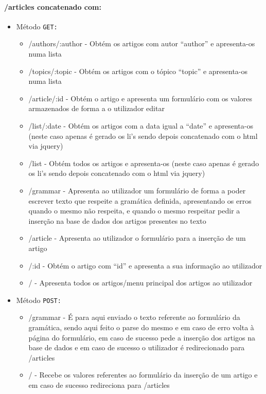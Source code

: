 \paragraph{/articles concatenado com:} 
\begin{itemize}
    \item Método \texttt{GET:}
        \begin{itemize}
            \item /authors/:author - Obtém os artigos com autor ``author'' e apresenta-os numa lista
            \item /topics/:topic - Obtém os artigos com o tópico ``topic'' e apresenta-os numa lista
            \item /article/:id - Obtém o artigo e apresenta um formulário com os valores armazenados de forma a o utilizador editar
            \item /list/:date - Obtém os artigos com a data igual a ``date'' e apresenta-os (neste caso apenas é gerado os li's sendo depois concatenado com o html via jquery)
            \item /list - Obtém todos os artigos e apresenta-os (neste caso apenas é gerado os li's sendo depois concatenado com o html via jquery)
            \item /grammar - Apresenta ao utilizador um formulário de forma a poder escrever texto que respeite a gramática definida, apresentando os erros quando o mesmo não respeita, e quando o mesmo respeitar pedir a inserção na base de dados dos artigos presentes no texto
            \item /article - Apresenta ao utilizador o formulário para a inserção de um artigo
            \item /:id - Obtém o artigo com ``id'' e apresenta a sua informação ao utilizador
            \item / - Apresenta todos os artigos/menu principal dos artigos ao utilizador
        \end{itemize}
    \item Método \texttt{POST:}
        \begin{itemize}
            \item /grammar - É para aqui enviado o texto referente ao formulário da gramática, sendo aqui feito o parse do mesmo e em caso de erro volta à página do formulário, em caso de sucesso pede a inserção dos artigos na base de dados e em caso de sucesso o utilizador é redirecionado para /articles
            \item / - Recebe os valores referentes ao formulário da inserção de um artigo e em caso de sucesso redireciona para /articles

\end{itemize}
\end{itemize}
